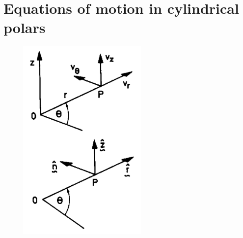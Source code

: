 \documentclass[twoside,a4paper,11pt]{report}
\begin{document}





\section{Equations of motion in cylindrical polars}

\begin{figure}
\centerline{\includegraphics[width=2.5in]{Section29.pdf}}
\label{fig9}
\end{figure}
\end{document}

